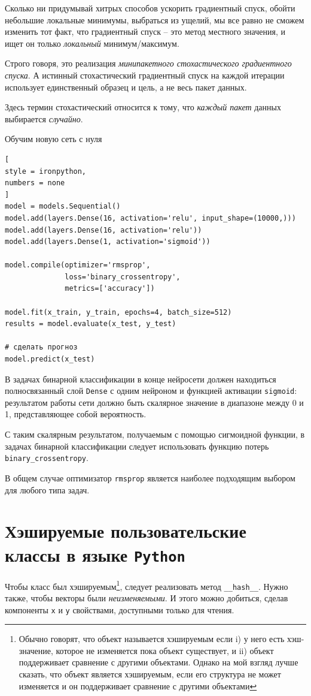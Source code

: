 \documentclass[%
	11pt,
	a4paper,
	utf8,
		]{article}
\begin{document}
Сколько ни придумывай хитрых способов ускорить градиентный спуск, обойти небольшие локальные минимумы, выбраться из ущелий, мы все равно не сможем изменить тот факт, что градиентный спуск -- это метод местного значения, и ищет он только \emph{локальный} минимум/максимум.

Строго говоря, это реализация \emph{минипакетного стохастического градиентного спуска}. А истинный стохастический градиентный спуск на каждой итерации использует единственный образец и цель, а не весь пакет данных.

Здесь термин стохастический относится к тому, что \emph{каждый пакет} данных выбирается \emph{случайно}.

Обучим новую сеть с нуля 
\begin{lstlisting}[
style = ironpython,
numbers = none
]
model = models.Sequential()
model.add(layers.Dense(16, activation='relu', input_shape=(10000,)))
model.add(layers.Dense(16, activation='relu'))
model.add(layers.Dense(1, activation='sigmoid'))

model.compile(optimizer='rmsprop',
              loss='binary_crossentropy',
              metrics=['accuracy'])
              
model.fit(x_train, y_train, epochs=4, batch_size=512)
results = model.evaluate(x_test, y_test)

# сделать прогноз
model.predict(x_test)
\end{lstlisting}

В задачах бинарной классификации в конце нейросети должен находиться полносвязанный слой \texttt{Dense} с одним нейроном и функцией активации \texttt{sigmoid}: результатом работы сети должно быть скалярное значение в диапазоне между 0 и 1, представляющее собой вероятность.

С таким скалярным результатом, получаемым с помощью сигмоидной функции, в задачах бинарной классификации следует использовать функцию потерь \texttt{binary\_crossentropy}.

В общем случае оптимизатор \texttt{rmsprop} является наиболее подходящим выбором для любого типа задач.



\section{Хэшируемые пользовательские классы в языке \texttt{Python}}

Чтобы класс был хэшируемым\footnote{Обычно говорят, что объект называется хэшируемым если i) у него есть хэш-значение, которое не изменяется пока объект существует, и ii) объект поддерживает сравнение с другими объектами. Однако на мой взгляд лучше сказать, что объект является хэшируемым, если его структура не может изменяется и он поддерживает сравнение с другими объектами}, следует реализовать метод \texttt{\_\_hash\_\_}. Нужно также, чтобы векторы были \emph{неизменяемыми}. И этого можно добиться, сделав компоненты \texttt{x} и \texttt{y} свойствами, доступными только для чтения.
\end{document}
